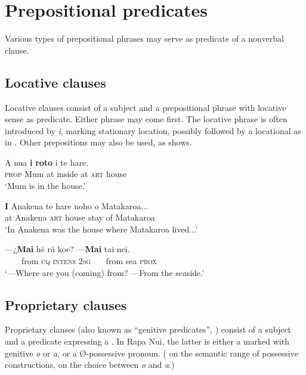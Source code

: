 
\section{Prepositional predicates}\label{sec:9.4}

Various types of prepositional phrases may serve as predicate of a nonverbal clause.

\subsection{Locative clauses}\label{sec:9.4.1}
Locative clauses consist of a subject  and a prepositional phrase with locative sense as predicate. Either phrase may come first. The locative phrase is often introduced by \textit{{\ꞌ}i}, marking stationary location, possibly followed by a locational as in . Other prepositions may also be used, as  shows.

\ea\label{ex:9.81}
\gll A nua \textbf{{\ꞌ}i} \textbf{roto} i te hare. \\
\textsc{prop} Mum at inside at \textsc{art} house \\

\glt 
‘Mum is in the house.’ \textstyleExampleref{[R333.284]} 
\z

\ea\label{ex:9.82}
\gll \textbf{{\ꞌ}I} {\ꞌ}Anakena te hare noho o Matakaroa... \\
at Anakena \textsc{art} house stay of Matakaroa \\

\glt 
‘In Anakena was the house where Matakaroa lived...’ \textstyleExampleref{[Mtx-3-09.003]}
\z

\ea\label{ex:9.83}
\gll —¿\textbf{Mai} hē rā koe? —\textbf{Mai} tai nei.\\
~~~~from \textsc{cq} \textsc{intens} \textsc{2sg} ~~~from sea \textsc{prox}\\

\glt 
‘—Where are you (coming) from? —From the seaside.’ \textstyleExampleref{[R245.084]} 
\z
{}

\subsection{Proprietary clauses}\label{sec:9.4.2}
Proprietary clauses (also known as “genitive predicates”, \citealt[248]{Dryer2007Clause}) consist of a subject  and a predicate expressing a . In Rapa Nui, the latter is either a  marked with genitive \textit{o} or \textit{{\ꞌ}a}, or a Ø-possessive pronoun. ( on the semantic range of possessive constructions,  on the choice between \textit{o} and \textit{{\ꞌ}a}.) 

